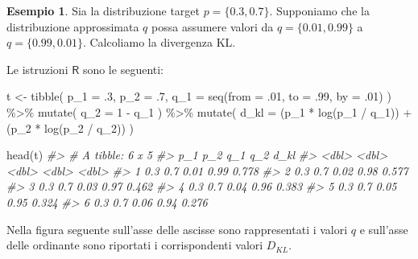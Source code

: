 \documentclass[
  10pt,
  italian,
  a4paper,
  extrafontsizes,onecolumn,openright
  ]{memoir}
\newenvironment{Shaded}{\begin{snugshade}}{\end{snugshade}}
\newcommand{\AttributeTok}[1]{\textcolor[rgb]{0.77,0.63,0.00}{#1}}
\newcommand{\CommentTok}[1]{\textcolor[rgb]{0.56,0.35,0.01}{\textit{#1}}}
\newcommand{\DecValTok}[1]{\textcolor[rgb]{0.00,0.00,0.81}{#1}}
\newcommand{\FunctionTok}[1]{\textcolor[rgb]{0.00,0.00,0.00}{#1}}
\newcommand{\NormalTok}[1]{#1}
\newcommand{\OtherTok}[1]{\textcolor[rgb]{0.56,0.35,0.01}{#1}}
\newcommand{\SpecialCharTok}[1]{\textcolor[rgb]{0.00,0.00,0.00}{#1}}
\newcommand{\R}{\textsf{R}} %
\theoremstyle{definition}
\theoremstyle{definition}
\newtheorem{example}{Esempio}[chapter]
\theoremstyle{definition}
\theoremstyle{definition}
\theoremstyle{remark}
\begin{document}
\begin{example}
\autocite[da][]{McElreath_rethinking} Sia la distribuzione target \(p = \{0.3, 0.7\}\). Supponiamo che la distribuzione approssimata \(q\) possa assumere valori da \(q = \{0.01, 0.99\}\) a \(q = \{0.99, 0.01\}\). Calcoliamo la divergenza KL.

Le istruzioni \(\R\) sono le seguenti:

\begin{Shaded}
\begin{Highlighting}[]
\NormalTok{t }\OtherTok{\textless{}{-}}
  \FunctionTok{tibble}\NormalTok{(}
    \AttributeTok{p\_1 =}\NormalTok{ .}\DecValTok{3}\NormalTok{,}
    \AttributeTok{p\_2 =}\NormalTok{ .}\DecValTok{7}\NormalTok{,}
    \AttributeTok{q\_1 =} \FunctionTok{seq}\NormalTok{(}\AttributeTok{from =}\NormalTok{ .}\DecValTok{01}\NormalTok{, }\AttributeTok{to =}\NormalTok{ .}\DecValTok{99}\NormalTok{, }\AttributeTok{by =}\NormalTok{ .}\DecValTok{01}\NormalTok{)}
\NormalTok{  ) }\SpecialCharTok{\%\textgreater{}\%}
  \FunctionTok{mutate}\NormalTok{(}
    \AttributeTok{q\_2 =} \DecValTok{1} \SpecialCharTok{{-}}\NormalTok{ q\_1}
\NormalTok{  ) }\SpecialCharTok{\%\textgreater{}\%}
  \FunctionTok{mutate}\NormalTok{(}
    \AttributeTok{d\_kl =}\NormalTok{ (p\_1 }\SpecialCharTok{*} \FunctionTok{log}\NormalTok{(p\_1 }\SpecialCharTok{/}\NormalTok{ q\_1)) }\SpecialCharTok{+}\NormalTok{ (p\_2 }\SpecialCharTok{*} \FunctionTok{log}\NormalTok{(p\_2 }\SpecialCharTok{/}\NormalTok{ q\_2))}
\NormalTok{  )}

\FunctionTok{head}\NormalTok{(t)}
\CommentTok{\#\textgreater{} \# A tibble: 6 x 5}
\CommentTok{\#\textgreater{}     p\_1   p\_2   q\_1   q\_2  d\_kl}
\CommentTok{\#\textgreater{}   \textless{}dbl\textgreater{} \textless{}dbl\textgreater{} \textless{}dbl\textgreater{} \textless{}dbl\textgreater{} \textless{}dbl\textgreater{}}
\CommentTok{\#\textgreater{} 1   0.3   0.7  0.01  0.99 0.778}
\CommentTok{\#\textgreater{} 2   0.3   0.7  0.02  0.98 0.577}
\CommentTok{\#\textgreater{} 3   0.3   0.7  0.03  0.97 0.462}
\CommentTok{\#\textgreater{} 4   0.3   0.7  0.04  0.96 0.383}
\CommentTok{\#\textgreater{} 5   0.3   0.7  0.05  0.95 0.324}
\CommentTok{\#\textgreater{} 6   0.3   0.7  0.06  0.94 0.276}
\end{Highlighting}
\end{Shaded}

\noindent
Nella figura seguente sull'asse delle ascisse sono rappresentati i valori \(q\) e sull'asse delle ordinante sono riportati i corrispondenti valori \(D_{KL}\).


\end{example}
\end{document}

